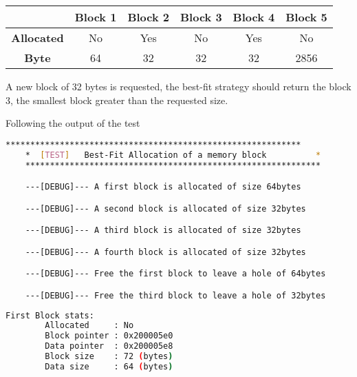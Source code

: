 
    \begin{table}[h]
    \centering
    \begin{tabular}{|c|c|c|c|c|c|}
    \hline
    & \textbf{Block 1} & \textbf{Block 2} & \textbf{Block 3} & \textbf{Block 4} & \textbf{Block 5} \\
    \hline
    \textbf{Allocated} & No & Yes & No & Yes & No \\
    \textbf{Byte} & 64 & 32 & 32 & 32 & 2856 \\
    \hline
    \end{tabular}
    \end{table}

    A new block of 32 bytes is requested, the best-fit strategy should return the block 3, the smallest block greater than the requested size.

    Following the output of the test

    \begin{outputbox}
    \begin{lstlisting}[language=bash]
    ************************************************************
    *  [TEST]   Best-Fit Allocation of a memory block          *
    ************************************************************

    ---[DEBUG]--- A first block is allocated of size 64bytes

    ---[DEBUG]--- A second block is allocated of size 32bytes

    ---[DEBUG]--- A third block is allocated of size 32bytes

    ---[DEBUG]--- A fourth block is allocated of size 32bytes

    ---[DEBUG]--- Free the first block to leave a hole of 64bytes

    ---[DEBUG]--- Free the third block to leave a hole of 32bytes
    \end{lstlisting}
    \end{outputbox}

    \begin{outputbox}
    \begin{lstlisting}[language=bash]
    First Block stats:
        Allocated     : No
        Block pointer : 0x200005e0
        Data pointer  : 0x200005e8
        Block size    : 72 (bytes)
        Data size     : 64 (bytes)
    \end{lstlisting}
    \end{outputbox}


